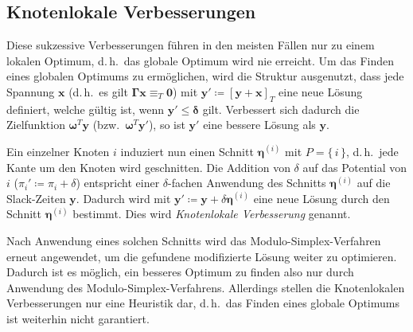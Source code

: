 \documentclass[a4paper, 10pt, twocolumn]{scrartcl}
\newcommand{\mat}[1]{\boldsymbol{#1}}
\renewcommand{\vec}[1]{\boldsymbol{#1}}
\newcommand{\bzw}{bzw.~}
\renewcommand{\dh}{d.\,h.~}
\begin{document}
	\subsection*{Knotenlokale Verbesserungen}
		Diese sukzessive Verbesserungen führen in den meisten Fällen nur zu einem lokalen Optimum, \dh das globale Optimum wird nie erreicht. Um das Finden eines globalen Optimums zu ermöglichen, wird die Struktur ausgenutzt, dass jede Spannung \(\vec{x}\) (\dh es gilt \( \mat{\Gamma} \vec{x} \equiv_T \vec{0} \)) mit \( \vec{y}' \coloneqq [\vec{y} + \vec{x}]_T \) eine neue Lösung definiert, welche gültig ist, wenn \( \vec{y}' \leq \vec{\delta} \) gilt. Verbessert sich dadurch die Zielfunktion \( \vec{\omega}^T \vec{y} \) (\bzw \( \vec{\omega}^T \vec{y}' \)), so ist \(\vec{y}'\) eine bessere Lösung als \(\vec{y}\).
		
		Ein einzelner Knoten \(i\) induziert nun einen Schnitt \( \vec{\eta}^{(i)} \) mit \( P = \{\, i \,\} \), \dh jede Kante um den Knoten wird geschnitten. Die Addition von \( \delta \) auf das Potential von \(i\) (\( \pi_i' \coloneqq \pi_i + \delta \)) entspricht einer \(\delta\)-fachen Anwendung des Schnitts \( \vec{\eta}^{(i)} \) auf die Slack-Zeiten \( \vec{y} \). Dadurch wird mit \( \vec{y}' \coloneqq \vec{y} + \delta\vec{\eta}^{(i)} \) eine neue Lösung durch den Schnitt \( \vec{\eta}^{(i)} \) bestimmt. Dies wird \emph{Knotenlokale Verbesserung} genannt.
		
		Nach Anwendung eines solchen Schnitts wird das Modulo-Simplex-Verfahren erneut angewendet, um die gefundene modifizierte Lösung weiter zu optimieren. Dadurch ist es möglich, ein besseres Optimum zu finden also nur durch Anwendung des Modulo-Simplex-Verfahrens. Allerdings stellen die Knotenlokalen Verbesserungen nur eine Heuristik dar, \dh das Finden eines globale Optimums ist weiterhin nicht garantiert.
\end{document}
